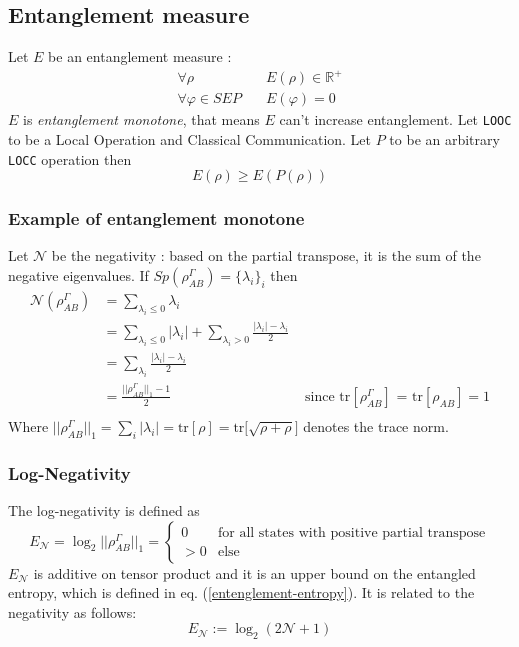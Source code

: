 \documentclass{article}
\begin{document}
\subsection{Entanglement measure}
Let $E$ be an entanglement measure :
\begin{equation}
    \begin{aligned}
        \forall \rho \quad
            & E(\rho) \in \mathbb{R}^+\\
        \forall \varphi \in SEP \quad
            & E(\varphi) = 0
    \end{aligned}
\end{equation}
$E$ is \textit{entanglement monotone}, that means $E$ can't increase
entanglement. Let \texttt{LOOC} to be a Local Operation and Classical
Communication.
Let $P$ to be an arbitrary \texttt{LOCC} operation then
\begin{equation}
    E(\rho) \geq E(P(\rho))
\end{equation}


\subsubsection*{Example of entanglement monotone}
Let $\mathscr{N}$ be the negativity : based on the partial transpose, it is the
sum of the negative eigenvalues. If $Sp(\rho_{AB}^\Gamma) = \{\lambda_i\}_i$ then
\begin{equation}
    \begin{aligned}
        \mathscr{N}(\rho_{AB}^\Gamma)
            & = \sum_{\lambda_i \leq 0}\lambda_i \\
            & = \sum_{\lambda_i \leq 0} |\lambda_i| +
                \sum_{\lambda_i > 0} \frac{ |\lambda_i| - \lambda_i}{2} \\
            & = \sum_{\lambda_i} \frac{ |\lambda_i| - \lambda_i}{2} \\
            & = \frac{||\rho_{AB}^\Gamma||_1 - 1 }{2} & \text{ since tr$[\rho_{AB}^\Gamma]$ = tr$[\rho_{AB}] = 1$} \\
    \end{aligned}
\end{equation}
Where $||\rho_{AB}^\Gamma||_1 = \sum_i |\lambda_i| = \text{tr}[\rho] =\text{tr}\big[\sqrt{\rho + \rho}\big]$
denotes the trace norm.

\subsubsection{Log-Negativity}
The log-negativity is defined as
\begin{equation}
    E_{\mathscr{N}} = \log_2 ||\rho_{AB}^\Gamma||_1 =
    \begin{cases}
        0 & \text{for all states with positive partial transpose}\\
        > 0 & \text{else}
    \end{cases}
\end{equation}
$E_{\mathscr{N}}$ is additive on tensor product and it is an upper bound on the
entangled entropy, which is defined in eq. (\ref{entenglement-entropy}).
It is related to the negativity as follows:
\begin{equation}
    E_{\mathscr{N}} := \log_2(2\mathscr{N} + 1)
\end{equation}
\newpage
\end{document}
